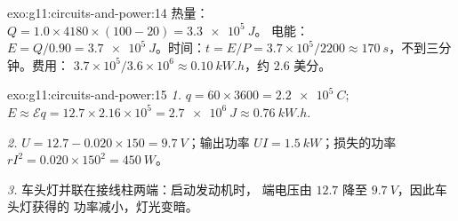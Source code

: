 \begin{solution}{exo:g11:circuits-and-power:14}
热量：$Q = 1.0 \times 4180 \times (100 - 20) = \qty{3.3e5}{J}$。
电能：$E = Q/0.90 = \qty{3.7e5}{J}$。时间：$t = E/P =
3.7\times10^{5}/2200 \approx \qty{170}{s}$，不到三分钟。费用：
$3.7\times10^{5}/3.6\times10^{6} \approx \qty{0.10}{kW.h}$，约 $2.6$
美分。
\end{solution}

\begin{solution}{exo:g11:circuits-and-power:15}
\emph{1.} $q = 60 \times 3600 = \qty{2.2e5}{C}$; $E \approx \mathcal{E}q
= 12.7 \times 2.16\times10^{5} = \qty{2.7e6}{J} \approx \qty{0.76}{kW.h}$.

\emph{2.} $U = 12.7 - 0.020 \times 150 = \qty{9.7}{V}$；输出功率
$UI = \qty{1.5}{kW}$；损失的功率 $rI^2 = 0.020 \times 150^2 = \qty{450}{W}$。

\emph{3.} 车头灯并联在接线柱两端：启动发动机时，
端电压由 $12.7$ 降至 $\qty{9.7}{V}$，因此车头灯获得的
功率减小，灯光变暗。
\end{solution}

